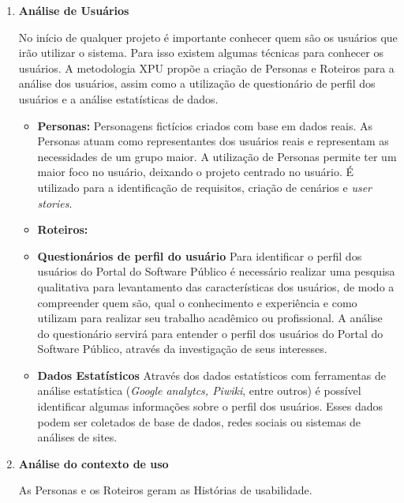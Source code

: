 \begin{enumerate}


	\item \textbf{Análise de Usuários}
	
	No início de qualquer projeto é importante conhecer quem são os usuários que irão utilizar o sistema. Para isso existem algumas técnicas para conhecer os usuários.
	A metodologia XPU propõe a criação de Personas e Roteiros para a análise dos usuários, assim como a utilização de questionário de perfil dos usuários e a análise estatísticas de dados.
	
	\begin{itemize}
		\item \textbf{Personas:} Personagens fictícios criados com base em dados reais. As Personas atuam como representantes dos usuários reais e representam as necessidades de um grupo maior. 
		A utilização de Personas permite ter um maior foco no usuário, deixando o projeto centrado no usuário. É utilizado para a identificação de requisitos, criação de cenários e \textit{user stories}. 
		\item \textbf{Roteiros:}		
		
		\item \textbf{Questionários de perfil do usuário} Para identificar o perfil dos usuários do Portal do Software Público é necessário realizar uma pesquisa qualitativa para levantamento das características  dos usuários, de modo a compreender quem são, qual o conhecimento e experiência e como utilizam para realizar seu trabalho acadêmico ou profissional. 
		A análise do questionário servirá para entender o perfil dos usuários do Portal do Software Público, através da investigação de seus interesses. 

		\item \textbf{Dados Estatísticos} Através dos dados estatísticos com ferramentas de análise estatística (\textit{Google analytcs, Piwiki}, entre outros) é possível identificar algumas informações sobre o perfil dos usuários. Esses dados podem ser coletados de base de dados, redes sociais ou sistemas de análises de sites. 

	\end{itemize}
			
		
	\item \textbf{Análise do contexto de uso}

	As Personas e os Roteiros geram as Histórias de usabilidade.



\end{enumerate}
